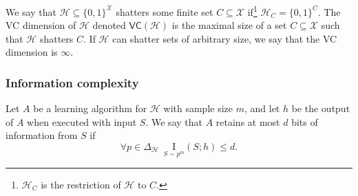 \documentclass[final,12pt]{colt2018}
\newcommand{\mc}[1]{\mathcal{#1}}
\newcommand{\cH}{\mc{H}}
\newcommand{\cX}{\mc{X}}
\newcommand{\cY}{\mc{Y}}
\newcommand{\I}[2]{\underset{#1}{\mathrm{I}}\left(#2\right)}
\newcommand{\VC}{\mathsf{VC}}
\begin{document}
%

\begin{definition}
	We say that $\cH \subseteq \{0,1\}^\cX$ shatters some finite set $C\subseteq \cX$ if\:\footnote{$\cH_C$ is the restriction of $\cH$ to $C$.}
	$\cH_C=\{0,1\}^C$.
	The {VC dimension of $\cH$} denoted $\VC(\cH)$ is the maximal size of a set $C \subseteq \cX$ such that $\cH$ shatters $C$. If $\cH$ can shatter sets of arbitrary size, we say that the VC dimension is $\infty$.
\end{definition}


\subsubsection*{Information complexity}

\begin{definition}
	Let $A$ be a learning algorithm for $\cH$ with sample size $m$, 
	and let $h$ be
	the output of $A$ when executed with input $S$. We say that $A$ retains at most $d$ bits of information from $S$
	if
	\[
	\forall p \in \Delta_\cH \ \  \I{S \sim p^m}{S;h} \leq d .
	\]
\end{definition}
\end{document}
